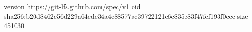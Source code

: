 version https://git-lfs.github.com/spec/v1
oid sha256:b20d8462c56d229a64ede34a4c88577ac39722121e6c835e83f47fef193f0ccc
size 451030
